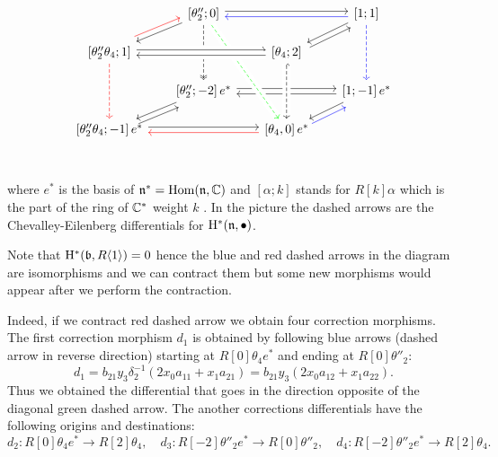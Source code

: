 $$
\begin{tikzcd}[row sep=scriptsize, column sep=scriptsize]
&\left[ \theta''_2;0\right]\arrow[dl] \arrow[rr,shift left=0.5ex] \arrow[dd, dashed, two heads] & & \left[1;1\right] \arrow[dl] \arrow[dd, dashed,blue]\arrow[ll,shift left=0.5ex,blue] \\
\left[\theta''_2\theta_4;1\right]\arrow[ur, shift left=1ex,red]  \arrow[dd, dashed, red] & & \left[\theta_4;2\right] \arrow[ur,shift right=1ex]\\
& \left[\theta''_2;-2\right] e^* \arrow[dl] \arrow[rr, shift left=0.5ex] &  & \left[1;-1\right] e^* \arrow[dl]\arrow[ll, shift left=0.5ex] \\
\left[\theta''_2\theta_4;-1\right]e^* \arrow[ur,shift right=1ex] \arrow[rr, shift left=0.5ex] & & \left[\theta_4,0\right]e^*\arrow[ur, shift right=1ex, blue]
\arrow[ll, shift left=0.5ex,red]\\
 \arrow[from=2-3, to=4-3, crossing over, dashed, hook]
\arrow[to=4-3, from=1-2, crossing over,dashed,green]
\arrow[from=2-1, to=2-3, shift left=0.5ex,crossing over]
\arrow[to=2-1, from=2-3, shift left=0.5ex,crossing over]
\end{tikzcd}
$$



where $e^*$ is the basis of $\mathfrak{n}^*=\mathop{{\rm Hom}}\nolimits(\mathfrak{n},\mathbb{C})$ and  $[\alpha;k]$ stands for $R[k]\alpha$ which  is the part of the ring of $\mathbb{C}^*$ weight $k$ . In the picture the dashed arrows are the Chevalley-Eilenberg  differentials for $\mathrm{H}^{*}(\mathfrak{n},\bullet)$.

Note that $\mathrm{H}^{*}(\mathfrak{b},R\langle 1\rangle)=0$ hence the blue and red dashed arrows in the diagram are isomorphisms and we can contract them but some new morphisms would appear after we perform the contraction.

Indeed, if we contract red  dashed arrow we obtain four correction morphisms. The first correction morphism $d_1$ is obtained by following blue arrows (dashed arrow in reverse direction) starting at $R[0]\theta_4 e^*$ and ending at $R[0]\theta''_2$:
$$d_1=b_{21}y_3\delta^{-1}_2(2x_0a_{11}+x_1a_{21})=b_{21}y_3(2x_0a_{12}+x_1a_{22}).$$
Thus we obtained the differential that goes in the direction opposite of the diagonal green dashed  arrow.
The another corrections differentials have the following origins and destinations:
$$d_2: R[0]\theta_4e^*\to R[2]\theta_4,\quad d_3: R[-2]\theta''_2e^*\to R[0]\theta''_2,\quad d_4: R[-2]\theta''_2e^*\to R[2]\theta_4.$$

